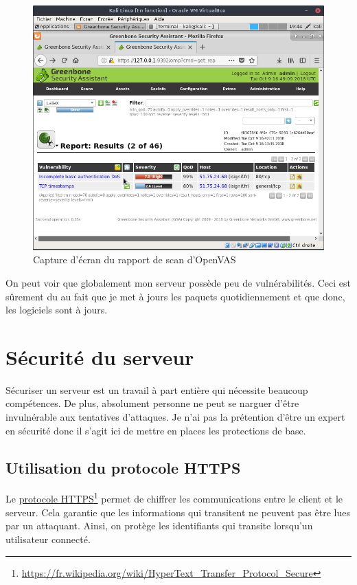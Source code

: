 \documentclass[]{report}
\newcommand\fnurl[2]{%
  \href{#1}{#2}\footnote{\url{#1}}%
}
\begin{document}
      \begin{figure}
        \includegraphics[width=\linewidth]{img/kali_openvas_report.png}
        \caption{Capture d'écran du rapport de scan d'OpenVAS}
        \label{fig:openvas_report}
      \end{figure}

      On peut voir que globalement mon serveur possède peu de vulnérabilités. Ceci est sûrement du au fait que je met à jours les paquets quotidiennement et que donc, les logiciels sont à jours.


  \section{Sécurité du serveur}

    Sécuriser un serveur est un travail à part entière qui nécessite beaucoup compétences. De plus, absolument personne ne peut se narguer d'être invulnérable aux tentatives d'attaques. Je n'ai pas la prétention d'être un expert en sécurité donc il s'agit ici de mettre en places les protections de base.

    \subsection{Utilisation du protocole HTTPS}

      Le \fnurl{https://fr.wikipedia.org/wiki/HyperText_Transfer_Protocol_Secure}{protocole HTTPS} permet de chiffrer les communications entre le client et le serveur. Cela garantie que les informations qui transitent ne peuvent pas être lues par un attaquant. Ainsi, on protège les identifiants qui transite lorsqu'un utilisateur connecté.
\end{document}

